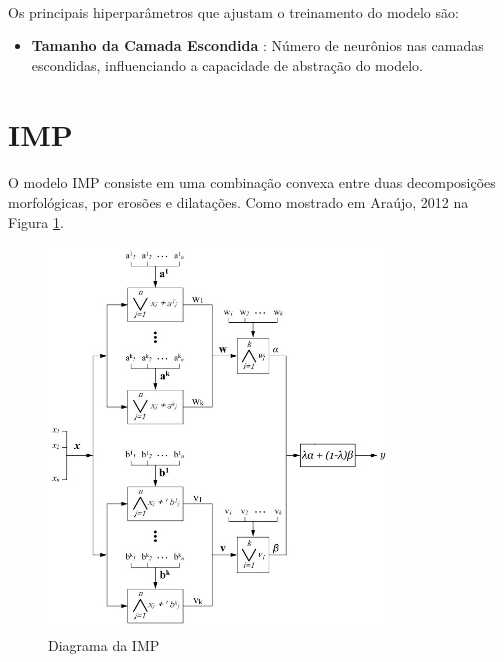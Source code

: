 \paragraph{} Os principais hiperparâmetros que ajustam o treinamento do modelo são:
\begin{itemize}
	\item \textbf{Tamanho da Camada Escondida}      : Número de neurônios nas camadas escondidas, influenciando a capacidade de abstração do modelo.
\end{itemize}

\section{\acf{IMP}}

\paragraph{} O modelo \ac{IMP} consiste em uma combinação convexa entre duas decomposições morfológicas, por erosões e dilatações. Como mostrado em Araújo, 2012 \cite{araujo_morphological_2012} na Figura \ref{fig:imp_diagram}.

\begin{figure}
	\begin{center}
		\begin{center}
			\includegraphics[width=0.8\textwidth]{figuras/imp_diagram.jpg}
			\caption{Diagrama da \acs{IMP}}
			\label{fig:imp_diagram}
		\end{center}

	\end{center}
\end{figure}
